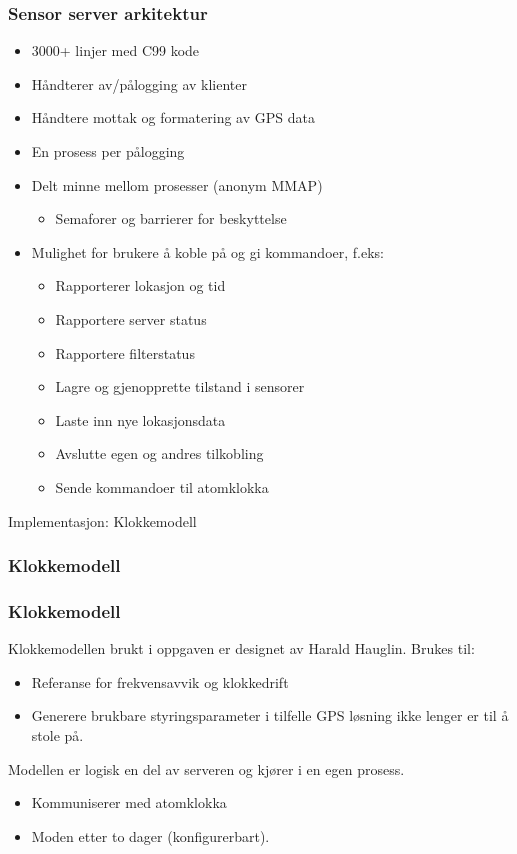 \documentclass[xcolor=table]{beamer}
\begin{document}
\begin{frame}
  \frametitle{Sensor server arkitektur}
  \begin{itemize}
    \item 3000+ linjer med C99 kode
    \item Håndterer av/pålogging av klienter
    \item Håndtere mottak og formatering av GPS data
    \item En prosess per pålogging
    \item Delt minne mellom prosesser (anonym MMAP)
      \begin{itemize}
        \item Semaforer og barrierer for beskyttelse
      \end{itemize}
    \item Mulighet for brukere å koble på og gi kommandoer, f.eks:
      \begin{itemize}
        \item Rapporterer lokasjon og tid
        \item Rapportere server status
        \item Rapportere filterstatus
        \item Lagre og gjenopprette tilstand i sensorer
        \item Laste inn nye lokasjonsdata
        \item Avslutte egen og andres tilkobling
        \item Sende kommandoer til atomklokka 
      \end{itemize}
  \end{itemize}
\end{frame}

\begin{frame}
\centering
Implementasjon: Klokkemodell
\end{frame}

\subsubsection{Klokkemodell}
\begin{frame}
  \frametitle{Klokkemodell}
    Klokkemodellen brukt i oppgaven er designet av Harald Hauglin. Brukes til:
    \begin{itemize}
      \item Referanse for frekvensavvik og klokkedrift 
      \item Generere brukbare styringsparameter i tilfelle GPS løsning ikke lenger er til å stole på.
    \end{itemize}
    Modellen er logisk en del av serveren og kjører i en egen prosess.
    \begin{itemize}
      \item Kommuniserer med atomklokka
      \item Moden etter to dager (konfigurerbart).
    \end{itemize}
\end{frame}
\end{document}
